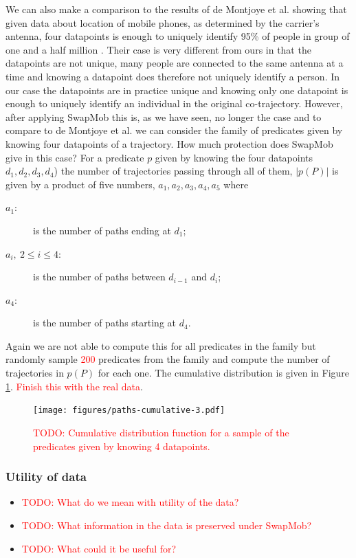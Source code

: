 \documentclass[12pt]{article}
\newcommand{\todo}[1]{\textcolor{red}{#1}}
\newcommand{\data}{d}
\newcommand{\pred}{p}
\newcommand{\paths}{P}
\theoremstyle{definition}
\begin{document}
We can also make a comparison to the results of de Montjoye et al.
showing that given data about location of mobile phones, as determined
by the carrier's antenna, four datapoints is enough to uniquely
identify 95\% of people in group of one and a half million
\cite{de_montjoye_unique_2013}. Their case is very different from ours
in that the datapoints are not unique, many people are connected to
the same antenna at a time and knowing a datapoint does therefore
not uniquely identify a person. In our case the datapoints are in
practice unique and knowing only one datapoint is enough to uniquely
identify an individual in the original co-trajectory. However, after
applying SwapMob this is, as we have seen, no longer the case and to
compare to de Montjoye et al. we can consider the family of predicates
given by knowing four datapoints of a trajectory. How much
protection does SwapMob give in this case? For a predicate \(\pred\)
given by knowing the four datapoints
\(\data_{1}, \data_{2}, \data_{3}, \data_{4}\)) the number of
trajectories passing through all of them, \(|\pred(\paths)|\) is given
by a product of five numbers, \(a_{1}, a_{2}, a_{3}, a_{4}, a_{5}\)
where
\begin{description}
\item[\(a_1\):] is the number of paths ending at \(\data_{1}\);
\item[\(a_i,\ 2 \leq i \leq 4\):] is the number of paths between
  \(\data_{i-1}\) and \(\data_{i}\);
\item[\(a_4\):] is the number of paths starting at \(\data_{4}\).
\end{description}

Again we are not able to compute this for all predicates in the family
but randomly sample \todo{200} predicates from the family and compute
the number of trajectories in \(\pred(\paths)\) for each one. The
cumulative distribution is given in Figure
\ref{fig:paths-cumulative-3}. \todo{Finish this with the real data}.

\begin{figure}
  \centering
  \texttt{[image: figures/paths-cumulative-3.pdf]}
  \caption{\todo{TODO: Cumulative distribution function for a sample
      of the predicates given by knowing 4 datapoints.}}
  \label{fig:paths-cumulative-3}
\end{figure}

\subsubsection{Utility of data}
\begin{itemize}
\item \todo{TODO: What do we mean with utility of the data?}
\item \todo{TODO: What information in the data is preserved under SwapMob?}
\item \todo{TODO: What could it be useful for?}
\end{itemize}
\end{document}
